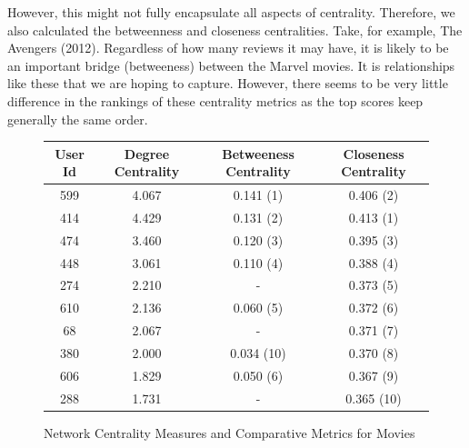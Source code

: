 \documentclass[12pt]{article}
\numberwithin{equation}{section}
\begin{document}
However, this might not fully encapsulate all aspects of centrality. Therefore, we also calculated the betweenness and closeness centralities. Take, for example, The Avengers (2012). Regardless of how many reviews it may have, it is likely to be an important bridge (betweeness) between the Marvel movies. It is relationships like these that we are hoping to capture. However, there seems to be very little difference in the rankings of these centrality metrics as the top scores keep generally the same order. 

\begin{figure}[h!]
\centering
\caption{Network Centrality Measures and Comparative Metrics for Movies}
    \begin{tabular}{|c|c|c|c|}
        \hline
        \textbf{User Id} & \textbf{Degree Centrality} & \textbf{Betweeness Centrality} & \textbf{Closeness Centrality} \\ 
        \hline
        599 & 4.067 & 0.141 (1) & 0.406 (2) \\
        414 & 4.429 & 0.131 (2) & 0.413 (1) \\
        474 & 3.460 & 0.120 (3) & 0.395 (3) \\
        448 & 3.061 & 0.110 (4) & 0.388 (4) \\
        274 & 2.210 & - & 0.373 (5) \\
        610 & 2.136 & 0.060 (5) & 0.372 (6) \\
        68  & 2.067 & - & 0.371 (7) \\
        380 & 2.000 & 0.034 (10) & 0.370 (8) \\
        606 & 1.829 & 0.050 (6) & 0.367 (9) \\
        288 & 1.731 & - & 0.365 (10) \\
        \hline
    \end{tabular}

   \vspace{0.2cm} %
    

\end{figure}
\end{document}
